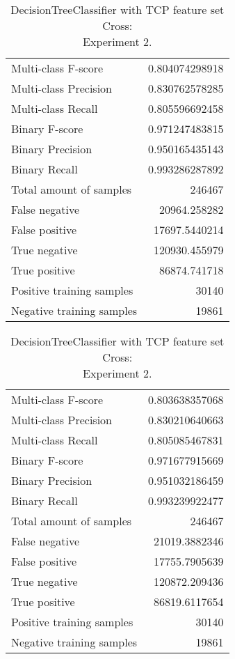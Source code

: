 \begin{table}[H]
\begin{minipage}{0.5\textwidth}
\caption{DecisionTreeClassifier with TCP feature set Cross: \\Experiment 1.}
\centering
\begin{tabular}{l r}
\toprule
Multi-class F-score & 0.804074298918 \\
Multi-class Precision & 0.830762578285 \\
Multi-class Recall & 0.805596692458 \\
\midrule
Binary F-score & 0.971247483815 \\
Binary Precision & 0.950165435143 \\
Binary Recall & 0.993286287892 \\
\midrule
Total amount of samples & 246467 \\
False negative & 20964.258282 \\
False positive & 17697.5440214 \\
True negative & 120930.455979 \\
True positive & 86874.741718 \\
\midrule
Positive training samples & 30140 \\
Negative training samples & 19861 \\
\bottomrule
\end{tabular}
\end{minipage}
\hfillx
\begin{minipage}{0.5\textwidth}
\caption{DecisionTreeClassifier with TCP feature set Cross: \\Experiment 2.}
\centering
\begin{tabular}{l r}
\toprule
Multi-class F-score & 0.803638357068 \\
Multi-class Precision & 0.830210640663 \\
Multi-class Recall & 0.805085467831 \\
\midrule
Binary F-score & 0.971677915669 \\
Binary Precision & 0.951032186459 \\
Binary Recall & 0.993239922477 \\
\midrule
Total amount of samples & 246467 \\
False negative & 21019.3882346 \\
False positive & 17755.7905639 \\
True negative & 120872.209436 \\
True positive & 86819.6117654 \\
\midrule
Positive training samples & 30140 \\
Negative training samples & 19861 \\
\bottomrule
\end{tabular}
\end{minipage}
\end{table}
